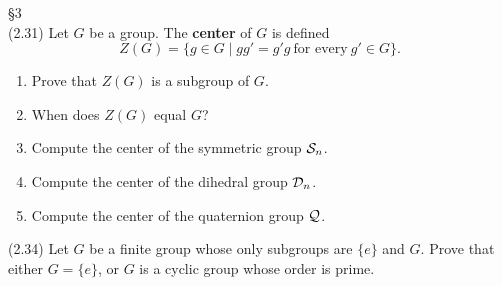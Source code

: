 \documentclass{homework}
\begin{document}
\begin{problem}{\S 3}\\
  (2.31) Let $G$ be a group. The \textbf{center} of $G$ is defined \[
    Z(G) = \{g\in G\mid gg'=g'g ~\text{for every}~g'\in G\} 
  .\] 
  \begin{enumerate}[label=(\alph*)]
    \item Prove that $Z(G)$ is a subgroup of $G$.
    \item When does $Z(G)$ equal $G$?
    \item Compute the center of the symmetric group $\mathcal{S}_n$.
    \item Compute the center of the dihedral group $\mathcal{D}_n$.
    \item Compute the center of the quaternion group $\mathcal{Q}$.
  \end{enumerate}

  (2.34) Let $G$ be a finite group whose only subgroups are $\{ e \}$ and $G$. Prove that either
  $G=\{ e \}$, or $G$ is a cyclic group whose order is prime.
\end{problem}
\end{document}
